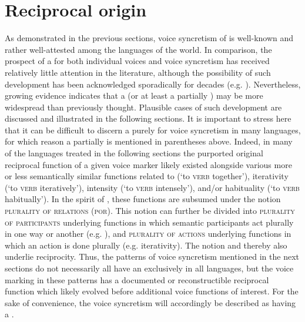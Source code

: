\section{Reciprocal origin} \label{diachrony:reciprocal}
As demonstrated in the previous sections, voice syncretism of  is well-known and rather well-attested among the languages of the world. In comparison, the prospect of a  for both individual voices and voice syncretism has received relatively little attention in the literature, although the possibility of such development has been acknowledged sporadically for decades (e.g. \citealt[200]{kemmer:1993}). Nevertheless, growing evidence indicates that a  (or at least a partially ) may be more widespread than previously thought. Plausible cases of such development are discussed and illustrated in the following sections. It is important to stress here that it can be difficult to discern a purely  for voice syncretism in many languages, for which reason a partially  is mentioned in parentheses above. Indeed, in many of the languages treated in the following sections the purported original reciprocal function of a given voice marker likely existed alongside various more or less semantically similar functions related to  (‘to \textsc{verb} together’), iterativity (‘to \textsc{verb} iteratively’), intensity (‘to \textsc{verb} intensely’), and/or habituality (‘to \textsc{verb} habitually’). In the spirit of \citet{lichtenberk:1985, lichtenberk:2000}, these functions are subsumed under the notion \textsc{plurality of relations} (\textsc{por}). This notion can further be divided into \textsc{plurality of participants} underlying functions in which semantic participants act plurally in one way or another (e.g. ), and \textsc{plurality of actions} underlying functions in which an action is done plurally (e.g. iterativity). The notion  and thereby  also underlie reciprocity. Thus, the patterns of voice syncretism mentioned in the next sections do not necessarily all have an exclusively  in all languages, but the voice marking in these patterns has a documented or reconstructible reciprocal function which likely evolved before additional voice functions of interest. For the sake of convenience, the voice syncretism will accordingly be described as having a .

